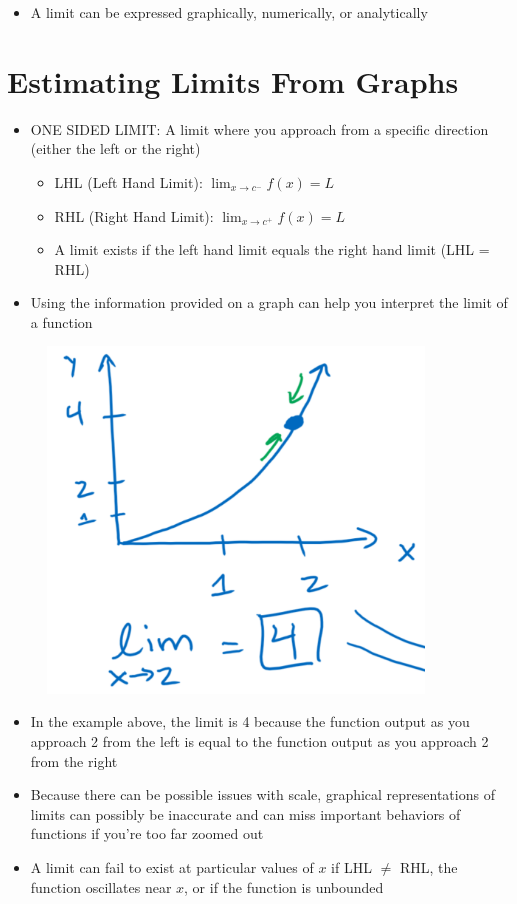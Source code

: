 \documentclass{package/notes}
\begin{document}
\begin{itemize}
	\item A limit can be expressed graphically, numerically, or analytically
\end{itemize}
\newpage

\section{Estimating Limits From Graphs}

\begin{itemize}
	\item ONE SIDED LIMIT: A limit where you approach from a specific direction (either the left or the right)
	\begin{itemize}
		\item LHL (Left Hand Limit): $\lim_{x\to c^-} f(x) = L$
		\item RHL (Right Hand Limit): $\lim_{x\to c^+} f(x) = L$
		\item A limit exists if the left hand limit equals the right hand limit (LHL = RHL)
	\end{itemize}
	\item Using the information provided on a graph can help you interpret the limit of a function
\end{itemize}

\begin{figure}[h]
	\begin{center}
		\includegraphics[width = 10cm]{images/1.2_Image.PNG}
	\end{center}
\end{figure}

\begin{itemize}
	\item In the example above, the limit is 4 because the function output as you approach 2 from the left is equal to the function output as you approach 2 from the right
	\item Because there can be possible issues with scale, graphical representations of limits can possibly be inaccurate and can miss important behaviors of functions if you're too far zoomed out
	\item A limit can fail to exist at particular values of $x$ if LHL $\ne$ RHL, the function oscillates near $x$, or if the function is unbounded
\end{itemize}
\newpage
\end{document}
